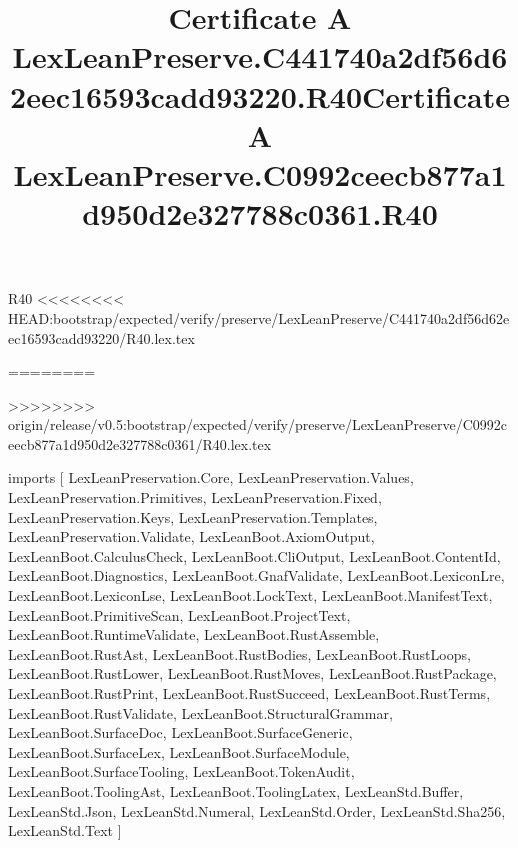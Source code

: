 \begin{lexlean}{R40}
<<<<<<<< HEAD:bootstrap/expected/verify/preserve/LexLeanPreserve/C441740a2df56d62eec16593cadd93220/R40.lex.tex
\title{Certificate A LexLeanPreserve.C441740a2df56d62eec16593cadd93220.R40}
========
\title{Certificate A LexLeanPreserve.C0992ceecb877a1d950d2e327788c0361.R40}
>>>>>>>> origin/release/v0.5:bootstrap/expected/verify/preserve/LexLeanPreserve/C0992ceecb877a1d950d2e327788c0361/R40.lex.tex
\begin{coremodule}
imports [
  LexLeanPreservation.Core,
  LexLeanPreservation.Values,
  LexLeanPreservation.Primitives,
  LexLeanPreservation.Fixed,
  LexLeanPreservation.Keys,
  LexLeanPreservation.Templates,
  LexLeanPreservation.Validate,
  LexLeanBoot.AxiomOutput,
  LexLeanBoot.CalculusCheck,
  LexLeanBoot.CliOutput,
  LexLeanBoot.ContentId,
  LexLeanBoot.Diagnostics,
  LexLeanBoot.GnafValidate,
  LexLeanBoot.LexiconLre,
  LexLeanBoot.LexiconLse,
  LexLeanBoot.LockText,
  LexLeanBoot.ManifestText,
  LexLeanBoot.PrimitiveScan,
  LexLeanBoot.ProjectText,
  LexLeanBoot.RuntimeValidate,
  LexLeanBoot.RustAssemble,
  LexLeanBoot.RustAst,
  LexLeanBoot.RustBodies,
  LexLeanBoot.RustLoops,
  LexLeanBoot.RustLower,
  LexLeanBoot.RustMoves,
  LexLeanBoot.RustPackage,
  LexLeanBoot.RustPrint,
  LexLeanBoot.RustSucceed,
  LexLeanBoot.RustTerms,
  LexLeanBoot.RustValidate,
  LexLeanBoot.StructuralGrammar,
  LexLeanBoot.SurfaceDoc,
  LexLeanBoot.SurfaceGeneric,
  LexLeanBoot.SurfaceLex,
  LexLeanBoot.SurfaceModule,
  LexLeanBoot.SurfaceTooling,
  LexLeanBoot.TokenAudit,
  LexLeanBoot.ToolingAst,
  LexLeanBoot.ToolingLatex,
  LexLeanStd.Buffer,
  LexLeanStd.Json,
  LexLeanStd.Numeral,
  LexLeanStd.Order,
  LexLeanStd.Sha256,
  LexLeanStd.Text
]


\end{coremodule}
\end{lexlean}

